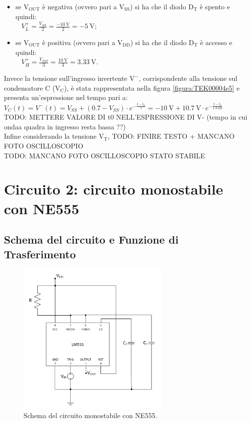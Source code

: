 \documentclass{report}
\begin{document}
\begin{itemize}
	\item se $\mathrm{V_{OUT}}$ è negativa (ovvero pari a $\mathrm{V_{SS}}$) si ha che il diodo $\mathrm{D_T}$ è spento e quindi:
	\\[4pt]$\displaystyle{\;\;\;V_L^+=\frac{V_{SS}}{2}=\frac{\SI{-10}{\volt}}{2}=\SI{-5}{\volt}}$;
	\item se $\mathrm{V_{OUT}}$ è positiva (ovvero pari a $\mathrm{V_{DD}}$) si ha che il diodo $\mathrm{D_T}$ è accesso e quindi:
	\\[4pt]$\displaystyle{\;\;\;V_H^+=\frac{V_{DD}}{3}=\frac{\SI{10}{\volt}}{3}=\SI{3.33}{\volt}}$.
\end{itemize}
Invece la tensione sull'ingresso invertente $\mathrm{V^-}$, corrispondente alla tensione sul condensatore C ($\mathrm{V_C}$), è stata rappresentata nella figura \ref{figura:TEK00004e5} e presenta un'espressione nel tempo pari a:
\\[4pt]\indent$\displaystyle{V_C(t)=V^-(t)=V_{SS}+(0.7-V_{SS})\cdot e^{-\frac{t-t_0}{\tau}}=\SI{-10}{\volt}+\SI{10.7}{\volt}\cdot e^{-\frac{t-t_0}{\SI{1.8}{m\second}}}}$
\\[4pt]TODO: METTERE VALORE DI t0 NELL'ESPRESSIONE DI V- (tempo in cui ondaa quadra in ingresso resta bassa ??)
\\Infine considerando la tensione $\mathrm{V_T}$, TODO: FINIRE TESTO + MANCANO FOTO OSCILLOSCOPIO
\\TODO: MANCANO FOTO OSCILLOSCOPIO STATO STABILE

\newpage
\section{Circuito 2: circuito monostabile con NE555}
\subsection{Schema del circuito e Funzione di Trasferimento}
\begin{figure}[h]
	\centering
	\includegraphics[height=7.5cm]{immagini/schema2}
	\caption{Schema del circuito monostabile con NE555.}
	\label{figura:schema2}
\end{figure}
\end{document}
